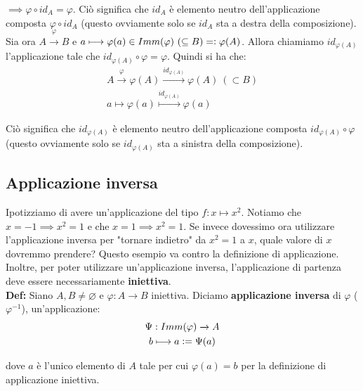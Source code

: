 \documentclass{article}
\begin{document}
\noindent $\implies \varphi \circ id_A = \varphi$. Ciò significa che $id_A$ è elemento neutro dell'applicazione composta $\varphi \circ id_A$ (questo ovviamente solo se $id_A$ sta a destra della composizione).\\

\noindent Sia ora $A \overset{\varphi}{\xrightarrow{}} B$ e $a \longmapsto \varphi(a) \in Imm(\varphi) \ (\subseteq B) = \vcentcolon \varphi(A)$. Allora chiamiamo $id_{\varphi(A)}$ l'applicazione tale che $id_{\varphi(A)} \circ \varphi = \varphi$. Quindi si ha che:
\begin{gather*}
    A \overset{\varphi}{\longrightarrow} \varphi(A) \overset{id_{\varphi(A)}}{\longrightarrow} \varphi(A) \ (\subset B) \\
    a \longmapsto \varphi(a) \overset{id_{\varphi(A)}}{\longmapsto} \varphi(a)
\end{gather*}

\noindent Ciò significa che $id_{\varphi(A)}$ è elemento neutro dell'applicazione composta $id_{\varphi(A)} \circ \varphi$ (questo ovviamente solo se $id_{\varphi(A)}$ sta a sinistra della composizione).\\

\subsection{Applicazione inversa}
Ipotizziamo di avere un'applicazione del tipo $f: x \longmapsto x^2$. Notiamo che $x = -1 \implies x^2 = 1$ e che $x = 1 \implies x^2 = 1$. Se invece dovessimo ora utilizzare l'applicazione inversa per "tornare indietro" da $x^2 = 1$ a $x$, quale valore di $x$ dovremmo prendere? Questo esempio va contro la definizione di applicazione. Inoltre, per poter utilizzare un'applicazione inversa, l'applicazione di partenza deve essere necessariamente \textbf{iniettiva}.\\

\noindent\textbf{Def:} Siano $A, B \neq \varnothing$ e $\varphi: A \xrightarrow{} B$ iniettiva. Diciamo \textbf{applicazione inversa} di $\varphi$ ($\varphi^{-1}$), un'applicazione:
\begin{gather*}
    \Psi: Imm(\varphi) \xrightarrow{} A\\
    b \longmapsto a \vcentcolon = \Psi(a)
\end{gather*}

\noindent dove $a$ è l'unico elemento di $A$ tale per cui $\varphi(a) = b$ per la definizione di applicazione iniettiva.\\
\end{document}
